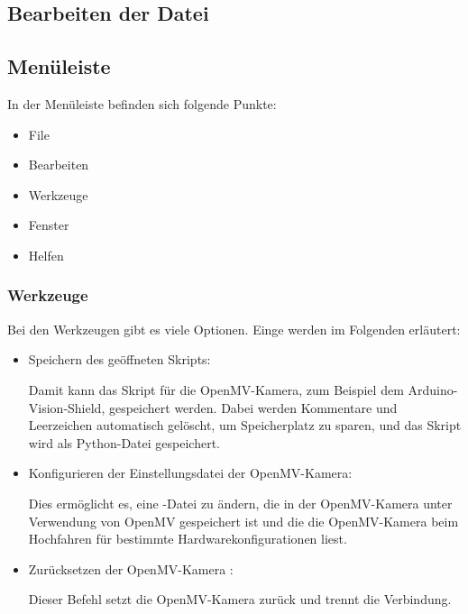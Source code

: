 \subsection{Bearbeiten der Datei}




\subsection{Menüleiste}


In der Menüleiste befinden sich folgende Punkte:

\begin{itemize}
	\item File
	\item Bearbeiten
	\item Werkzeuge
	\item Fenster
	\item Helfen
\end{itemize}

\subsubsection{Werkzeuge}

Bei den Werkzeugen gibt es viele Optionen. Einge werden im Folgenden erläutert:

\begin{itemize}
	\item Speichern des geöffneten Skripts:
	
	Damit kann das Skript für die OpenMV-Kamera, zum Beispiel dem Arduino-Vision-Shield, gespeichert werden. Dabei werden Kommentare und Leerzeichen automatisch gelöscht, um Speicherplatz zu sparen, und das Skript wird als Python-Datei  gespeichert.
	
	\item Konfigurieren der Einstellungsdatei der OpenMV-Kamera:
	
	Dies ermöglicht es, eine -Datei zu ändern, die in der OpenMV-Kamera unter Verwendung von OpenMV gespeichert ist und die die OpenMV-Kamera beim Hochfahren für bestimmte Hardwarekonfigurationen liest.
	
	\item Zurücksetzen der OpenMV-Kamera :
	
	Dieser Befehl setzt die OpenMV-Kamera zurück und trennt die Verbindung.
	
\end{itemize} 


